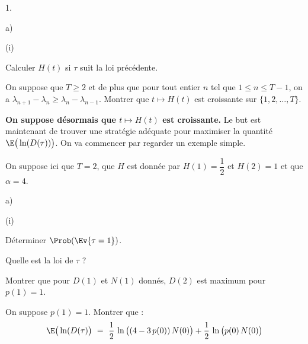 \begin{noliste}{1.}
\begin{noliste}{a)}
\begin{nonoliste}{(i)}
      

      
      \item Calculer $H(t)$ si $\tau$ suit la loi précédente.
      
      
      
      

      
      \item On suppose que $T\geq 2$ et de plus que pour tout entier 
      $n$ tel que $1 \leq n \leq T-1$, on a $\lambda_{n+1} - 
      \lambda_n \geq \lambda_n - \lambda_{n-1}$. Montrer que 
      $t \mapsto H(t)$ est croissante sur $\{1,2, \ldots, T\}$.
      
      
    \end{nonoliste}
  \end{noliste}
  
  \noindent
  {\bf On suppose désormais que $t \mapsto H(t)$ est croissante.} Le 
  but est maintenant de trouver une stratégie adéquate pour maximiser 
  la quantité $\E\big(\ln(D(\tau))\big)$. On va commencer par regarder 
  un exemple simple.
  
  \item On suppose ici que $T=2$, que $H$ est donnée par $H(1) =
  \dfrac{1}{2}$ et $H(2)=1$ et que $\alpha=4$.
  \begin{noliste}{a)}
    \setlength{\itemsep}{2mm}
    \item 
    \begin{nonoliste}{(i)}
      \item Déterminer $\Prob(\Ev{\tau=1})$.
      
      
      
      

      
      \item Quelle est la loi de $\tau$ ?
      
      
    \end{nonoliste}
    
    \item Montrer que pour $D(1)$ et $N(1)$ donnés, $D(2)$ est maximum
    pour $p(1)=1$.
    
    

    
    \item On suppose $p(1)=1$. Montrer que :
    \[
      \E\big(\ln(D(\tau)\big) \ = \ \dfrac{1}{2} \, \ln\big((4-3 \, 
      p(0)) \, N(0)\big) + \dfrac{1}{2} \, \ln\big(p(0) \, N(0)\big)
    \]
    
    
    
    


\end{noliste}
\end{noliste}
